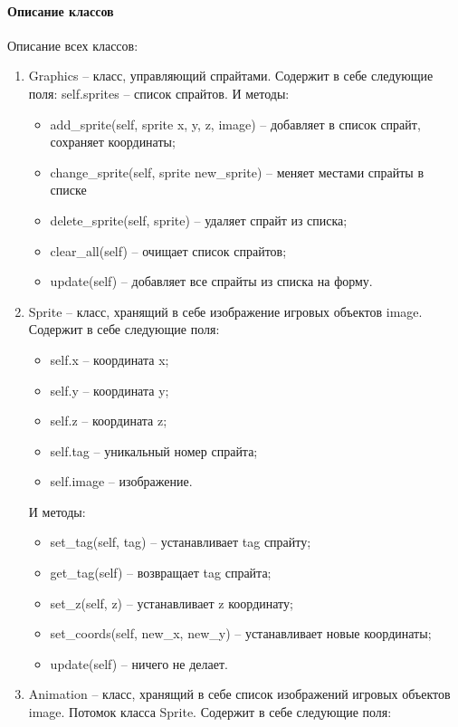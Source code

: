 \paragraph{Описание классов}
Описание всех классов:
\begin{enumerate}
	\item Graphics -- класс, управляющий спрайтами. Содержит в себе следующие поля: self.sprites -- список спрайтов. И методы:
		\begin{itemize}
			\item add\_sprite(self, sprite x, y, z, image) -- добавляет в список спрайт, сохраняет координаты;
			\item change\_sprite(self, sprite new\_sprite) -- меняет местами спрайты в списке
			\item delete\_sprite(self, sprite) -- удаляет спрайт из списка;
			\item clear\_all(self) -- очищает список спрайтов;
			\item update(self) -- добавляет все спрайты из списка на форму.
		\end{itemize}
	\item Sprite -- класс, хранящий в себе изображение игровых объектов image. Содержит в себе следующие поля:
		\begin{itemize}
			\item self.x -- координата x;
			\item self.y -- координата y;
			\item self.z -- координата z;
			\item self.tag -- уникальный номер спрайта;
			\item self.image -- изображение.
		\end{itemize}
		И методы:
		\begin{itemize}
			\item set\_tag(self, tag) -- устанавливает tag спрайту;
			\item get\_tag(self) -- возвращает tag спрайта;
			\item set\_z(self, z) -- устанавливает z координату;
			\item set\_coords(self, new\_x, new\_y) -- устанавливает новые координаты;
			\item update(self) -- ничего не делает.
		\end{itemize}
	\item Animation -- класс, хранящий в себе список изображений игровых объектов image. Потомок класса Sprite.  Содержит в себе следующие поля:
		\begin{itemize}

\end{itemize}
\end{enumerate}
